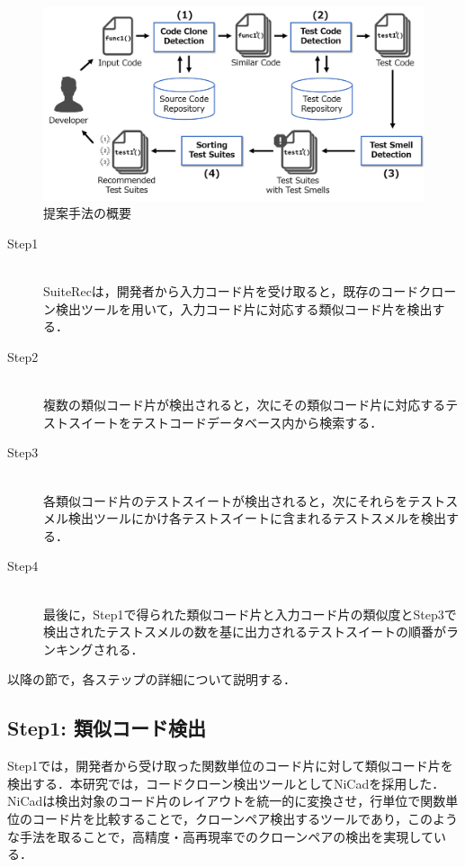 \documentclass[12pt]{jarticle} %
\begin{document}
\begin{figure}[htbp]
  \begin{center}
    \includegraphics[clip,width=15cm]{SuiteRec-outline.pdf}
    \caption{提案手法の概要}
    \label{SO}
  \end{center}
\end{figure}

\newpage
\begin{description}
\item[Step1]~\\
{\sf SuiteRec}は，開発者から入力コード片を受け取ると，既存のコードクローン検出ツールを用いて，入力コード片に対応する類似コード片を検出する．
\item[Step2]~\\
複数の類似コード片が検出されると，次にその類似コード片に対応するテストスイートをテストコードデータベース内から検索する．
\item[Step3]~\\
各類似コード片のテストスイートが検出されると，次にそれらをテストスメル検出ツールにかけ各テストスイートに含まれるテストスメルを検出する．
\item[Step4]~\\
最後に，Step1で得られた類似コード片と入力コード片の類似度とStep3で検出されたテストスメルの数を基に出力されるテストスイートの順番がランキングされる．
\end{description}

以降の節で，各ステップの詳細について説明する．

\subsection{Step1: 類似コード検出}

Step1では，開発者から受け取った関数単位のコード片に対して類似コード片を検出する．本研究では，コードクローン検出ツールとして{\sf NiCad}\cite{b2}を採用した．{\sf NiCad}は検出対象のコード片のレイアウトを統一的に変換させ，行単位で関数単位のコード片を比較することで，クローンペア検出するツールであり，このような手法を取ることで，高精度・高再現率でのクローンペアの検出を実現している．
\end{document}
